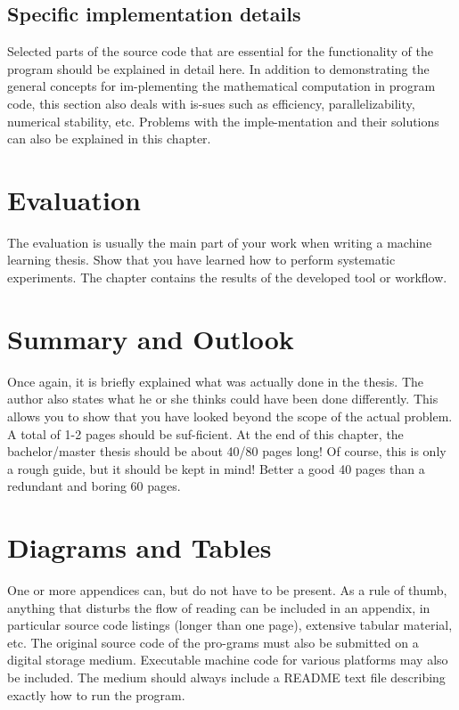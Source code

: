 \documentclass[12pt]{report}           %
\theoremstyle{thesis}        %
\begin{document}
	
	
	
	
	\section{Specific implementation details}
	Selected parts of the source code that are essential for the functionality of the program should be explained in detail here. In addition to demonstrating the general concepts for im-plementing the mathematical computation in program code, this section also deals with is-sues such as efficiency, parallelizability, numerical stability, etc. Problems with the imple-mentation and their solutions can also be explained in this chapter.
	
	\chapter{Evaluation}
	\label{chap:anwendung}
The evaluation is usually the main part of your work when writing a machine learning thesis. Show that you have learned how to perform systematic experiments. The chapter contains the results of the developed tool or workflow. 
	\chapter{Summary and Outlook}
	\label{chap:zusammenfassung}
	
Once again, it is briefly explained what was actually done in the thesis. The author also states what he or she thinks could have been done differently. This allows you to show that you have looked beyond the scope of the actual problem. A total of 1-2 pages should be suf-ficient.  At the end of this chapter, the bachelor/master thesis should be about 40/80 pages long! Of course, this is only a rough guide, but it should be kept in mind! Better a good 40 pages than a redundant and boring 60 pages.
	
	
	
	\appendix
	\baselineskip=18pt
	\chapter{Diagrams and Tables}
	\label{chap:anhang_a}
	One or more appendices can, but do not have to be present. As a rule of thumb, anything that disturbs the flow of reading can be included in an appendix, in particular source code listings (longer than one page), extensive tabular material, etc. The original source code of the pro-grams must also be submitted on a digital storage medium. Executable machine code for various platforms may also be included. The medium should always include a README text file describing exactly how to run the program.
	
\end{document}
